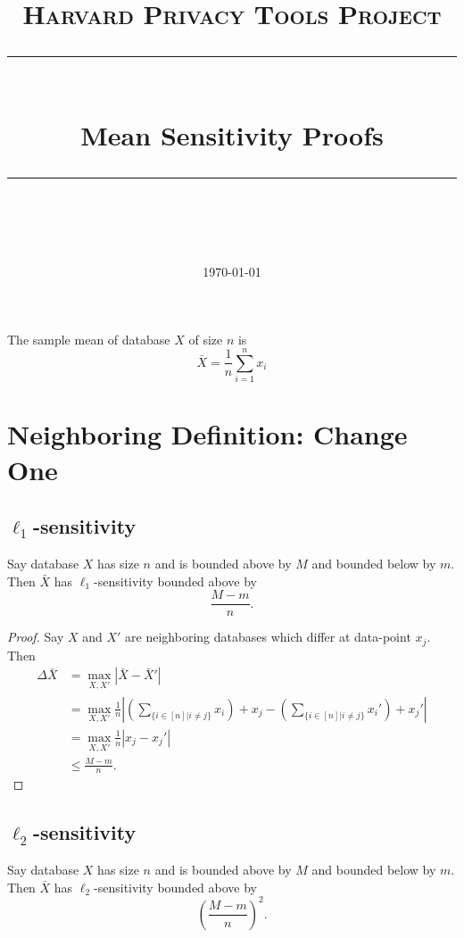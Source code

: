 \documentclass[11pt]{scrartcl} %
\title{
	\normalfont\normalsize
	\textsc{Harvard Privacy Tools Project}\\ %
	\vspace{25pt} %
	\rule{\linewidth}{0.5pt}\\ %
	\vspace{20pt} %
	{\huge Mean Sensitivity Proofs}\\ %
	\vspace{12pt} %
	\rule{\linewidth}{2pt}\\ %
	\vspace{12pt} %
}
\date{\normalsize\today} %
\begin{document}
\maketitle

\begin{definition}
The sample mean of database $X$ of size $n$ is
$$\bar{X} = \frac{1}{n} \sum_{i=1}^n x_i $$
\end{definition}

\section{Neighboring Definition: Change One}

\subsection{$\ell_1$-sensitivity}
\begin{theorem}
Say database $X$ has size $n$ and is bounded above by $M$ and bounded below by $m$. Then $\bar{X}$ has $\ell_1$-sensitivity bounded above by
$$ \frac{M-m}{n}.$$
\end{theorem}

\begin{proof}
Say $X$ and $X'$ are neighboring databases which differ at data-point $x_j$. Then
\begin{align*}
\Delta{\bar{X}} &= \max_{X,X'} \left\vert \bar{X} - \bar{X}' \right\vert \\
	&=  \max_{X,X'} \frac{1}{n} \left\vert \left(\sum_{\{ i \in [n] \vert i \ne j\}} x_i\right) + x_j  - \left(\sum_{\{ i \in [n] \vert i \ne j\}} x_i'\right) + x_j'  \right\vert \\
	&= \max_{X,X'} \frac{1}{n} \left\vert x_j - x_j' \right\vert \\
	&\le \frac{M-m}{n}.
\end{align*}
\end{proof}

\subsection{$\ell_2$-sensitivity}
\begin{theorem}
	Say database $X$ has size $n$ and is bounded above by $M$ and bounded below by $m$.
	Then $\bar{X}$ has $\ell_2$-sensitivity bounded above by
	 $$ \left(\frac{M-m}{n}\right)^2. $$
\end{theorem}
\end{document}
